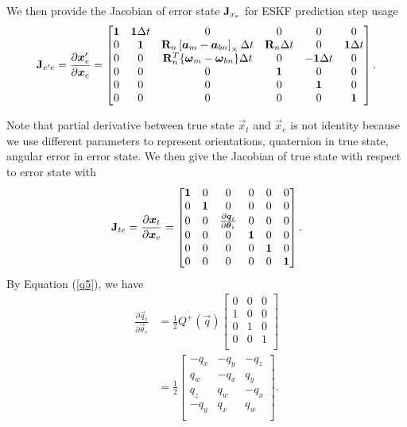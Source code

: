 We then provide the Jacobian of error state $\mathbf{J}_{x_e}$ for ESKF prediction step usage
\begin{equation}\label{f14}
	\mathbf{J}_{e^\prime e} = \frac{\partial{\boldsymbol{x}_e^{\prime}}}{\partial{\boldsymbol{x}_e }} = \begin{bmatrix}
	\mathbf{1} & \mathbf{1}\Delta{t} & 0 & 0 & 0 & 0 \\
	0 & \mathbf{1} & \mathbf{R}_n \left[ \boldsymbol{a}_m - \boldsymbol{a}_{bn} \right]_{\times}\Delta{t} & \mathbf{R}_n\Delta{t} & 0 & \mathbf{1}\Delta{t} \\
	0 & 0 & \mathbf{R}_n^T \{ \boldsymbol{\omega}_m - \boldsymbol{\omega}_{bn} \}\Delta{t} & 0 & -\mathbf{1}\Delta{t} & 0 \\
	0 & 0 & 0 & \mathbf{1} & 0 & 0 \\
	0 & 0 & 0 & 0 & \mathbf{1} & 0 \\
	0 & 0 & 0 & 0 & 0 & \mathbf{1} \\
	\end{bmatrix}.
\end{equation}

Note that partial derivative between true state $\vec{x}_t$ and $\vec{x}_e$ is not identity because we use different parameters to represent orientations, \eg quaternion in true state, angular error in error state. We then give the Jacobian of true state with respect to error state with
\begin{equation}\label{f15}
	\mathbf{J}_{t e} = \frac{\partial{\boldsymbol{x}_t}}{\partial{\boldsymbol{x}_e }} = \begin{bmatrix}
	\mathbf{1} & 0 & 0 & 0 & 0 & 0 \\
	0 & \mathbf{1} &0 & 0 & 0 & 0 \\
	0 & 0 & \frac{\partial{\boldsymbol{q}_t}}{\partial{\boldsymbol{\theta}_e }} & 0 & 0 & 0 \\
	0 & 0 & 0 & \mathbf{1} & 0 & 0 \\
	0 & 0 & 0 & 0 & \mathbf{1} & 0 \\
	0 & 0 & 0 & 0 & 0 & \mathbf{1} \\
	\end{bmatrix}.
\end{equation}
By Equation (\ref{q5}), we have
\begin{align}\label{f16}
	\frac{\partial{\vec{q}_t}}{\partial{\vec{\theta}_e }} &= \frac{1}{2}Q^+(\vec{q})\begin{bmatrix}
	0 & 0 & 0 \\
	1 & 0 & 0 \\
	0 & 1 & 0 \\
	0 & 0 & 1 \\
	\end{bmatrix} \\
	&= \frac{1}{2}\begin{bmatrix}
	-q_x & -q_y & -q_z \\
	q_w & -q_x & q_y \\
	q_z & q_w & -q_x \\
	-q_y & q_x & q_w \\
	\end{bmatrix}. 
\end{align}

